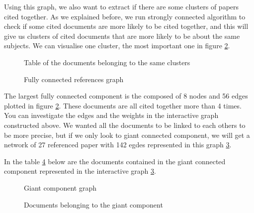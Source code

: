 \documentclass[article,twocolumn]{IEEEtran}
\begin{document}
    Using this graph, we also want to extract if there are some clusters of
papers cited together. As we explained before, we run strongly connected
algorithm to check if some cited documents are more likely to be cited
together, and this will give us clusters of cited documents that are
more likely to be about the same subjects. We can visualise one cluster,
the most important one in figure \ref{fig12}.


    \begin{figure}
        \begin{center}\end{center}
        \caption{Table of the documents belonging to the same clusters}
        \label{fig9}
    \end{figure}
    


    \begin{figure}
        \begin{center}\end{center}
        \caption{Fully connected references graph}
        \label{fig12}
    \end{figure}
    
    The largest fully connected component is the composed of 8 nodes and 56
edges plotted in figure \ref{fig12}. These documents are all cited
together more than 4 times. You can investigate the edges and the
weights in the interactive graph constructed above. We wanted all the
documents to be linked to each others to be more precise, but if we only
look to giant connected component, we will get a network of 27
referenced paper with 142 egdes represented in this graph \ref{fig15}.


    In the table \ref{fig10} below are the documents contained in the giant
connected component represented in the interactive graph \ref{fig15}.


    \begin{figure}
        \begin{center}\end{center}
        \caption{Giant component graph}
        \label{fig15}
    \end{figure}
    

    \begin{figure}
        \begin{center}\end{center}
        \caption{Documents belonging to the giant component}
        \label{fig10}
    \end{figure}
    
\end{document}
